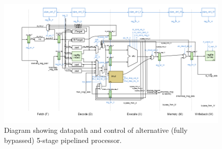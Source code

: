 \documentclass[10pt]{article}
\begin{document}

\begin{figure}[b]
\centering
\includegraphics[scale=0.5]{alt}
\caption{Diagram showing datapath and control of alternative (fully bypassed) 5-stage pipelined processor.}
\label{fig:alternative}
\end{figure}
\end{document}
